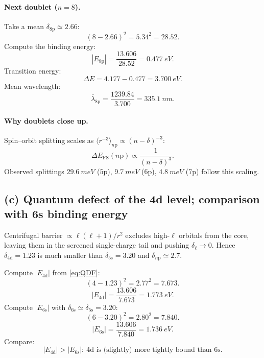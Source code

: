 \documentclass[11pt]{article}
\begin{document}
\paragraph{Next doublet ($n=8$).} Take a mean $\delta_{8\mathrm{p}}\simeq 2.66$:
\begin{equation}
(8-2.66)^{2}=5.34^{2}=28.52.
\end{equation}
Compute the binding energy:
\begin{equation}
|E_{8\mathrm{p}}|=\frac{13.606}{28.52}=\SI{0.477}{eV}.
\label{eq:E8p}
\end{equation}
Transition energy:
\begin{equation}
\Delta E=4.177-0.477=\SI{3.700}{eV}.
\end{equation}
Mean wavelength:
\begin{equation}
\boxed{\;\bar\lambda_{8\mathrm{p}}=\frac{1239.84}{3.700}=\SI{335.1}{nm}.\;}
\label{eq:lambda8p}
\end{equation}

\paragraph{Why doublets close up.} Spin--orbit splitting scales as $\langle r^{-3}\rangle_{n\mathrm{p}}\propto (n-\delta)^{-3}$:
\begin{equation}
\Delta E_{\mathrm{FS}}(n\mathrm{p})\propto \frac{1}{(n-\delta)^{3}}.
\end{equation}
Observed splittings $\SI{29.6}{meV}$ ($5\mathrm{p}$), $\SI{9.7}{meV}$ ($6\mathrm{p}$), $\SI{4.8}{meV}$ ($7\mathrm{p}$) follow this scaling.

\subsection*{(c) Quantum defect of the 4d level; comparison with 6s binding energy}

Centrifugal barrier $\propto \ell(\ell+1)/r^{2}$ excludes high-$\ell$ orbitals from the core, leaving them in the screened single-charge tail and pushing $\delta_{\ell}\to 0$. Hence $\delta_{4\mathrm{d}}=1.23$ is much smaller than $\delta_{5\mathrm{s}}=3.20$ and $\delta_{n\mathrm{p}}\simeq 2.7$.

Compute $|E_{4\mathrm{d}}|$ from \eqref{eq:QDF}:
\begin{equation}
(4-1.23)^{2}=2.77^{2}=7.673.
\end{equation}
\begin{equation}
|E_{4\mathrm{d}}|=\frac{13.606}{7.673}=\SI{1.773}{eV}.
\label{eq:E4d}
\end{equation}
Compute $|E_{6\mathrm{s}}|$ with $\delta_{6\mathrm{s}}\simeq\delta_{5\mathrm{s}}=3.20$:
\begin{equation}
(6-3.20)^{2}=2.80^{2}=7.840.
\end{equation}
\begin{equation}
|E_{6\mathrm{s}}|=\frac{13.606}{7.840}=\SI{1.736}{eV}.
\label{eq:E6s}
\end{equation}
Compare:
\begin{equation}
\boxed{\;|E_{4\mathrm{d}}|>|E_{6\mathrm{s}}|:\ \text{4d is (slightly) more tightly bound than 6s.}\;}
\end{equation}
\end{document}
